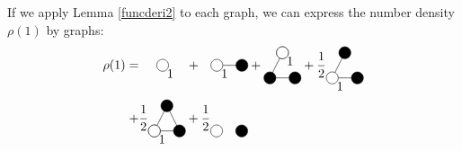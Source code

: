 \documentclass[8.5pt,twoside,twocolumn]{article}
\theoremstyle{standard}
\begin{document}
If we apply Lemma \ref{funcderi2} to each graph, we can express the number density $\rho(1)$ by graphs:
\begin{equation}
\begin{aligned}
\rho(1)=&
\fgbox{\begin{tikzpicture}[baseline=-.1cm]
  \draw(0,0) node[circle,minimum size=.2cm,draw] (A) {};
  \node [below right] at (A) {1};
\end{tikzpicture}}
+
\fgbox{\begin{tikzpicture}[baseline=-.1cm]%
  \draw(0,0) node[circle,minimum size=.2cm,draw] (A) {};
  \draw(.7,0) node[circle,minimum size=.2cm,draw,fill=black] (B) {};
  \draw (A.east) --  (B.center);
  \node [below right] at (A) {1};
\end{tikzpicture}}
+
\gbox{\begin{tikzpicture}[baseline=.25cm]
  \draw(0,0) node[circle,minimum size=.2cm,draw,fill=black] (A) {};
  \draw(.7,0) node[circle,minimum size=.2cm,draw,fill=black] (B) {};
  \draw(.35,.7) node[circle,minimum size=.2cm,draw] (C) {};
  \draw (A.center) --  (B.west);
  \draw (A.center) --  (C.center);
  \draw node[circle,minimum size=.2cm,draw,fill=white,opacity=1] at (C) {};
  \node [below right] at (C) {1};
\end{tikzpicture}}
+\frac 1 2
\gbox{\begin{tikzpicture}[baseline=.25cm]
  \draw(.7,0) node[circle,minimum size=.2cm,draw,fill=black] (B) {};
  \draw(.35,.7) node[circle,minimum size=.2cm,draw,fill=black] (C) {};
  \draw (0,0) --  (B.center);
  \draw (0,0) --  (C.center);
  \draw(0,0) node[circle,minimum size=.2cm,draw,fill=white] (A) {};
  \node [below right] at (A) {1};
\end{tikzpicture}}
\\+& 
\frac 1 2
\begin{tikzpicture}[baseline=.25cm]
  \draw(0,0) node[circle,minimum size=.2cm,draw] (A) {};
  \draw(.7,0) node[circle,minimum size=.2cm,draw,fill=black] (B) {};
  \draw(.35,.7) node[circle,minimum size=.2cm,draw,fill=black] (C) {};
  \draw (A.center) --  (B.center);
  \draw (A.center) --  (C.center);
  \draw (B.center) --  (C.center);
  \draw node[circle,minimum size=.2cm,draw,fill=white,opacity=1] at (A) {};
  \node [below right] at (A) {1};
\end{tikzpicture}
 +
 \frac 1 2 
 \begin{tikzpicture}[baseline=.25cm]
  \draw(0,0) node[circle,minimum size=.2cm,draw] (A) {};
  \draw(.7,0) node[circle,minimum size=.2cm,draw,fill=black] (B) {};

\end{tikzpicture}
\end{aligned}
\end{equation}
\end{document}
